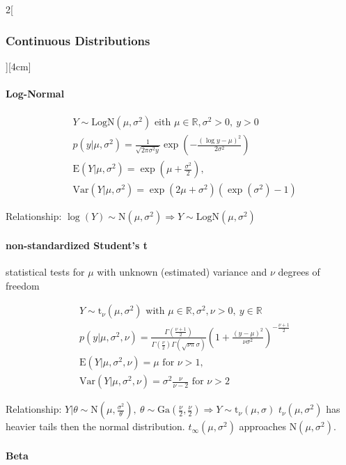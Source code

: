 \documentclass[8pt]{extarticle}
\begin{document}
\begin{multicols}{2}[\subsubsection{Continuous Distributions}][4cm]
    \paragraph{Log-Normal}
  
    \begin{align*}
    & Y \sim \mathrm{LogN}(\mu, \sigma^2) \text{ eith } \mu \in \mathbb{R}, \sigma^2 > 0,\: y > 0 \\
    & p(y|\mu, \sigma^2) =\frac{1}{\sqrt{2\pi\sigma^2 y}} \exp \left(-\frac{(\log y-\mu)^2}{2 \sigma^2} \right) \\
    & \mathrm{E}(Y|\mu, \sigma^2) = \exp (\mu + \frac{\sigma^2}{2}) ,\\
    & \mathrm{Var}(Y|\mu, \sigma^2) = \exp (2\mu + \sigma^2)(\exp (\sigma^2) - 1)
  \end{align*}
  
\noindent Relationship: $\log (Y) \sim \mathrm{N}(\mu, \sigma^2) \Rightarrow Y \sim \mathrm{LogN}(\mu, \sigma^2)$
  
    \paragraph{non-standardized Student's t} statistical tests for $\mu$ with unknown (estimated) variance and $\nu$ degrees of freedom
  
    \begin{align*}
    & Y \sim \mathrm{t}_\nu(\mu, \sigma^2) \text{ with } \mu \in \mathbb{R}, \sigma^2, \nu > 0,\: y \in \mathbb{R}\\
    & p(y|\mu, \sigma^2, \nu) =\frac{\Gamma \left( \frac{\nu + 1}{2}\right) }{\Gamma (\frac{\nu}{2}) \Gamma (\sqrt{\nu\pi}\sigma)} \left(1+ \frac{(y-\mu)^2}{\nu \sigma^2} \right)^{-\frac{\nu + 1}{2}} \\
    & \mathrm{E}(Y|\mu, \sigma^2, \nu) = \mu \text{ for }  \nu > 1,\\
    & \mathrm{Var}(Y|\mu, \sigma^2, \nu) = \sigma^2 \frac{\nu}{\nu-2} \text{ for }  \nu > 2
  \end{align*}
  
 \noindent Relationship: $Y|\theta \sim \mathrm{N}(\mu, \frac{\sigma^2}{\theta}), \: \theta \sim  \mathrm{Ga}(\frac{\nu}{2}, \frac{\nu}{2}) \Rightarrow Y \sim \mathrm{t}_\nu(\mu, \sigma)$ 
 $t_\nu(\mu,\sigma^2)$ has heavier tails then the normal distribution. $t_\infty(\mu,\sigma^2)$ approaches $\mathrm{N}(\mu,\sigma^2)$.
  
	\paragraph{Beta}
  

\end{multicols}
\end{document}
